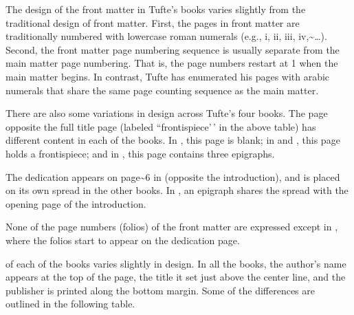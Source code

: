 \documentclass[
  letterpaper,
  DIV=11,
  numbers=noendperiod]{scrartcl}
\begin{document}
\bigskip

The design of the front matter in Tufte's books varies slightly from the
traditional design of front matter. First, the pages in front matter are
traditionally numbered with lowercase roman numerals (e.g., i, ii, iii,
iv,\textasciitilde{}\ldots). Second, the front matter page numbering
sequence is usually separate from the main matter page numbering. That
is, the page numbers restart at 1 when the main matter begins. In
contrast, Tufte has enumerated his pages with arabic numerals that share
the same page counting sequence as the main matter.

There are also some variations in design across Tufte's four books. The
page opposite the full title page (labeled ``frontispiece'\,' in the
above table) has different content in each of the books. In \VDQI, this
page is blank; in \EI and \VE, this page holds a frontispiece; and in
\BE, this page contains three epigraphs.

The dedication appears on page\textasciitilde6 in \vdqi (opposite the
introduction), and is placed on its own spread in the other books. In
\ve, an epigraph shares the spread with the opening page of the
introduction.

None of the page numbers (folios) of the front matter are expressed
except in \be, where the folios start to appear on the dedication page.

 of each of the books varies slightly in
design. In all the books, the author's name appears at the top of the
page, the title it set just above the center line, and the publisher is
printed along the bottom margin. Some of the differences are outlined in
the following table.
\end{document}
